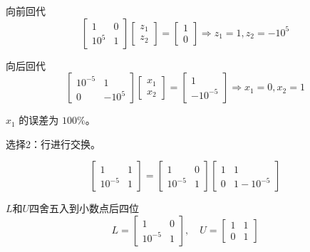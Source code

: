 \begin{example}
    向前回代
    $$
        \left[\begin{array}{cc}
                1      & 0 \\
                10^{5} & 1
            \end{array}\right]\left[\begin{array}{l}
                z_{1} \\
                z_{2}
            \end{array}\right]=\left[\begin{array}{l}
                1 \\
                0
            \end{array}\right] \Rightarrow z_{1}=1, z_{2}=-10^{5}
    $$

    向后回代
    $$
        \left[\begin{array}{cc}
                10^{-5} & 1       \\
                0       & -10^{5}
            \end{array}\right]\left[\begin{array}{l}
                x_{1} \\
                x_{2}
            \end{array}\right]=\left[\begin{array}{l}
                1 \\
                -10^{-5}
            \end{array}\right] \Rightarrow x_{1}=0, x_{2}=1
    $$

    \begin{remark}
        $ x_{1} $ 的误差为 $ 100 \% $。
    \end{remark}



    选择2：行进行交换。

    $$ \left[\begin{array}{cc}1 & 1 \\ 10^{-5} & 1\end{array}\right]=\left[\begin{array}{cc}1 & 0 \\ 10^{-5} & 1\end{array}\right]\left[\begin{array}{cc}1 & 1 \\ 0 & 1-10^{-5}\end{array}\right] $$

    $L$和$U$四舍五入到小数点后四位
    $$
        L=\left[\begin{array}{cc}
                1       & 0 \\
                10^{-5} & 1
            \end{array}\right], \quad U=\left[\begin{array}{ll}
                1 & 1 \\
                0 & 1
            \end{array}\right]
    $$


\end{example}
